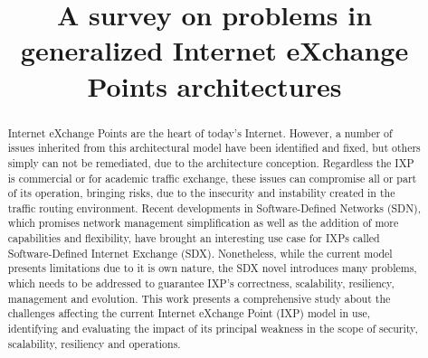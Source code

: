\documentclass[conference]{IEEEtran/IEEEtran}
\begin{document}
\title{A survey on problems in generalized Internet eXchange Points architectures}

\author{
}

\maketitle

\begin{abstract}
Internet eXchange Points are the heart of today's Internet. However, a number of issues inherited from this architectural model have been identified and fixed, but others simply can not be remediated, due to the architecture conception. Regardless the IXP is commercial or for academic traffic exchange, these issues can compromise all or part of its operation, bringing risks, due to the insecurity and instability created in the traffic routing environment. Recent developments in Software-Defined Networks (SDN), which promises network management simplification as well as the addition of more capabilities and flexibility, have brought an interesting use case for IXPs called Software-Defined Internet Exchange (SDX). Nonetheless, while the current model presents limitations due to it is own nature, the SDX novel introduces many problems, which needs to be addressed to guarantee IXP's correctness, scalability, resiliency, management and evolution. This work presents a comprehensive study about the challenges affecting the current Internet eXchange Point (IXP) model in use, identifying and evaluating the impact of its principal weakness in the scope of security, scalability, resiliency and operations. 
\end{abstract}

%
\IEEEpeerreviewmaketitle
\end{document}
